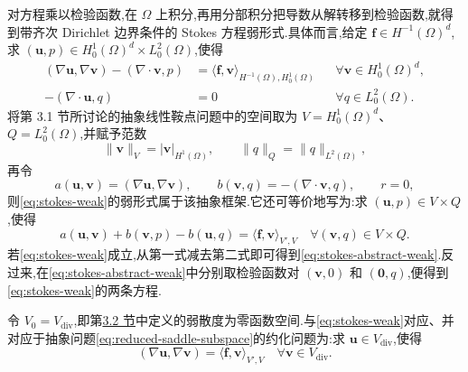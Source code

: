 \begin{note}\label{note:stokes-weak-form}
对方程乘以检验函数,在 $\Omega$ 上积分,再用分部积分把导数从解转移到检验函数,就得到带齐次 Dirichlet 边界条件的 Stokes 方程弱形式.具体而言,给定 $\bm{f}\in H^{-1}(\Omega)^d$,求
$(\bm{u},p)\in H_0^1(\Omega)^d\times L_0^2(\Omega)$,使得
\begin{equation}\label{eq:stokes-weak}
\begin{aligned}
  (\nabla\bm{u},\nabla\bm{v})
    -(\nabla\cdot\bm{v},p)
    &=\langle\bm{f},\bm{v}\rangle_{H^{-1}(\Omega),H_0^1(\Omega)}
       &&\forall\bm{v}\in H_0^1(\Omega)^d,\\
  -(\nabla\cdot\bm{u},q)&=0
       &&\forall q\in L_0^2(\Omega).
\end{aligned}
\end{equation}
将第 3.1 节所讨论的抽象线性鞍点问题中的空间取为 $V=H_0^1(\Omega)^d$、$Q=L_0^2(\Omega)$,并赋予范数
\[
  \|\bm{v}\|_V=|\bm{v}|_{H^1(\Omega)},
  \qquad \|q\|_Q=\|q\|_{L^2(\Omega)},
\]
再令
\[
  a(\bm{u},\bm{v})=(\nabla\bm{u},\nabla\bm{v}),
  \qquad b(\bm{v},q)=-(\nabla\cdot\bm{v},q),
  \qquad r=0,
\]
则\cref{eq:stokes-weak}的弱形式属于该抽象框架.它还可等价地写为:求 $(\bm{u},p)\in V\times Q$,使得
\begin{equation}\label{eq:stokes-abstract-weak}
  a(\bm{u},\bm{v})+b(\bm{v},p)-b(\bm{u},q)
   =\langle\bm{f},\bm{v}\rangle_{V',V}
   \quad\forall(\bm{v},q)\in V\times Q.
\end{equation}
若\cref{eq:stokes-weak}成立,从第一式减去第二式即可得到\cref{eq:stokes-abstract-weak}.反过来,在\cref{eq:stokes-abstract-weak}中分别取检验函数对 $(\bm{v},0)$ 和 $(\bm{0},q)$,便得到\cref{eq:stokes-weak}的两条方程.

令 $V_0=V_{\mathrm{div}}$,即第\hyperref[sec:continuous-flow-function-spaces]{3.2 节}中定义的弱散度为零函数空间.与\cref{eq:stokes-weak}对应、并对应于抽象问题\cref{eq:reduced-saddle-subspace}的约化问题为:求 $\bm{u}\in V_{\mathrm{div}}$,使得
\begin{equation}\label{eq:stokes-divergence-free-weak}
  (\nabla\bm{u},\nabla\bm{v})
    =\langle\bm{f},\bm{v}\rangle_{V',V}
    \quad\forall\bm{v}\in V_{\mathrm{div}}.
\end{equation}
\end{note}

